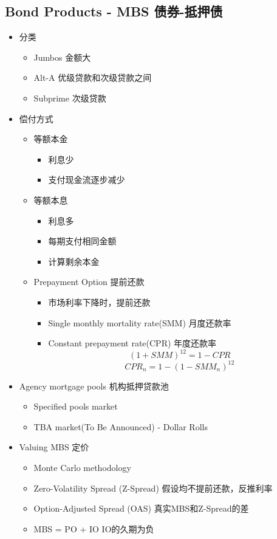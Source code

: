\documentclass[a4paper,6pt,twoside,openany]{article}
\begin{document}
\subsection{Bond Products - MBS 债券-抵押债}
\begin{itemize}
\item 分类
  \begin{itemize}
  \item Jumbos 金额大
  \item Alt-A 优级贷款和次级贷款之间
  \item Subprime 次级贷款
  \end{itemize}
\item 偿付方式
  \begin{itemize}
  \item 等额本金
    \begin{itemize}
    \item 利息少
    \item 支付现金流逐步减少
    \end{itemize}
  \item 等额本息
    \begin{itemize}
    \item 利息多
    \item 每期支付相同金额
    \item 计算剩余本金
    \end{itemize}
  \item Prepayment Option 提前还款
    \begin{itemize}
    \item 市场利率下降时，提前还款
    \item Single monthly mortality rate(SMM) 月度还款率
    \item Constant prepayment rate(CPR) 年度还款率
      $$(1+ SMM)^{12} = 1 - CPR$$
      $$CPR_n = 1 - (1-SMM_n)^{12}$$
    \end{itemize}
  \end{itemize}
  
\item Agency mortgage pools 机构抵押贷款池
  \begin{itemize}
  \item Specified pools market
  \item TBA market(To Be Announced) - Dollar Rolls
  \end{itemize}
   
\item Valuing MBS 定价
  \begin{itemize}
  \item Monte Carlo methodology
  \item Zero-Volatility Spread (Z-Spread) 假设均不提前还款，反推利率
  \item Option-Adjusted Spread (OAS) 真实MBS和Z-Spread的差
  \item MBS = PO + IO  IO的久期为负
  \end{itemize}
\end{itemize}
\end{document}
